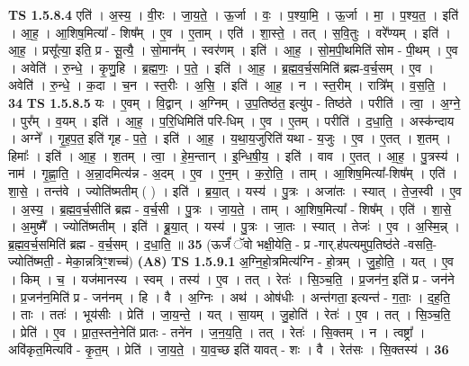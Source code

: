 \documentclass[17pt]{extarticle}
\begin{document}
                  \newline
                                \textbf{ TS 1.5.8.4} \newline
                  एति॑ । अ॒स्य॒ । वी॒रः । जा॒य॒ते॒ । ऊ॒र्जा । वः॒ । प॒श्या॒मि॒ । ऊ॒र्जा । मा॒ । प॒श्य॒त॒ । इति॑ । आ॒ह॒ । आ॒शिष॒मित्या᳚ - शिष᳚म् । ए॒व । ए॒ताम् । एति॑ । शा॒स्ते॒ । तत् । स॒वि॒तुः । वरे᳚ण्यम् । इति॑ । आ॒ह॒ । प्रसू᳚त्या॒ इति॒ प्र - सू॒त्यै॒ । सो॒मान᳚म् । स्वर॑णम् । इति॑ । आ॒ह॒ । सो॒म॒पी॒थमिति॑ सोम - पी॒थम् । ए॒व । अवेति॑ । रु॒न्धे॒ । कृ॒णु॒हि । ब्र॒ह्म॒णः॒ । प॒ते॒ । इति॑ । आ॒ह॒ । ब्र॒ह्म॒व॒र्च॒समिति॑ ब्रह्म-व॒र्च॒सम् । ए॒व । अवेति॑ । रु॒न्धे॒ । क॒दा । च॒न । स्त॒रीः । अ॒सि॒ । इति॑ । आ॒ह॒ । न । स्त॒रीम् । रात्रि᳚म् । व॒स॒ति॒ । \textbf{  34} \newline
                  \newline
                                \textbf{ TS 1.5.8.5} \newline
                  यः । ए॒वम् । वि॒द्वान् । अ॒ग्निम् । उ॒प॒तिष्ठ॑त॒ इत्यु॑प - तिष्ठ॑ते । परीति॑ । त्वा॒ । अ॒ग्ने॒ । पुर᳚म् । व॒यम् । इति॑ । आ॒ह॒ । प॒रि॒धिमिति॑ परि-धिम् । ए॒व । ए॒तम् । परीति॑ । द॒धा॒ति॒ । अस्क॑न्दाय । अग्ने᳚ । गृ॒ह॒प॒त॒ इति॑ गृह - प॒ते॒ । इति॑ । आ॒ह॒ । य॒था॒य॒जुरिति॑ यथा - य॒जुः । ए॒व । ए॒तत् । श॒तम् । हिमाः᳚ । इति॑ । आ॒ह॒ । श॒तम् । त्वा॒ । हे॒म॒न्तान् । इ॒न्धि॒षी॒य॒ । इति॑ । वाव । ए॒तत् । आ॒ह॒ । पु॒त्रस्य॑ । नाम॑ । गृ॒ह्णा॒ति॒ । अ॒न्ना॒दमित्य॑न्न - अ॒दम् । ए॒व । ए॒न॒म् । क॒रो॒ति॒ । ताम् । आ॒शिष॒मित्या᳚-शिष᳚म् । एति॑ । शा॒से॒ । तन्त॑वे । ज्योति॑ष्मतीम् ( ) । इति॑ । ब्र॒या॒त् । यस्य॑ । पु॒त्रः । अजा॑तः । स्यात् । ते॒ज॒स्वी । ए॒व । अ॒स्य॒ । ब्र॒ह्म॒व॒र्च॒सीति॑ ब्रह्म - व॒र्च॒सी । पु॒त्रः । जा॒य॒ते॒ । ताम् । आ॒शिष॒मित्या᳚ - शिष᳚म् । एति॑ । शा॒से॒ । अ॒मुष्मै᳚ । ज्योति॑ष्मतीम् । इति॑ । ब्रू॒या॒त् । यस्य॑ । पु॒त्रः । जा॒तः । स्यात् । तेजः॑ । ए॒व । अ॒स्मि॒न्न् । ब्र॒ह्म॒व॒र्च॒समिति॑ ब्रह्म - व॒र्च॒सम् । द॒धा॒ति॒ ॥ \textbf{  35} \newline
                  \newline
                      (ऊर्जं॑ ॅवो भक्षी॒येति॒ - प्र -गार्.ह॑पत्यमुप॒तिष्ठ॑ते -वसति॒-ज्योति॑ष्मती॒ - मेका॒न्नत्रिꣳ॒॒शच्च॑)  \textbf{(A8)} \newline \newline
                                \textbf{ TS 1.5.9.1} \newline
                  अ॒ग्नि॒हो॒त्रमित्य॑ग्नि - हो॒त्रम् । जु॒हो॒ति॒ । यत् । ए॒व । किम् । च॒ । यज॑मानस्य । स्वम् । तस्य॑ । ए॒व । तत् । रेतः॑ । सि॒ञ्च॒ति॒ । प्र॒जन॑न॒ इति॑ प्र - जन॑ने । प्र॒जन॑न॒मिति॑ प्र - जन॑नम् । हि । वै । अ॒ग्निः । अथ॑ । ओष॑धीः । अन्त॑गता॒ इत्यन्त॑ - ग॒ताः॒ । द॒ह॒ति॒ । ताः । ततः॑ । भूय॑सीः । प्रेति॑ । जा॒य॒न्ते॒ । यत् । सा॒यम् । जु॒होति॑ । रेतः॑ । ए॒व । तत् । सि॒ञ्च॒ति॒ । प्रेति॑ । ए॒व । प्रा॒त॒स्तने॒नेति॑ प्रातः - तने॑न । ज॒न॒य॒ति॒ । तत् । रेतः॑ । सि॒क्तम् । न । त्वष्ट्रा᳚ । अवि॑कृत॒मित्यवि॑ - कृ॒त॒म् । प्रेति॑ । जा॒य॒ते॒ । या॒व॒च्छ इति॑ यावत् - शः । वै । रेत॑सः । सि॒क्तस्य॑ । \textbf{  36} \newline
\end{document}
